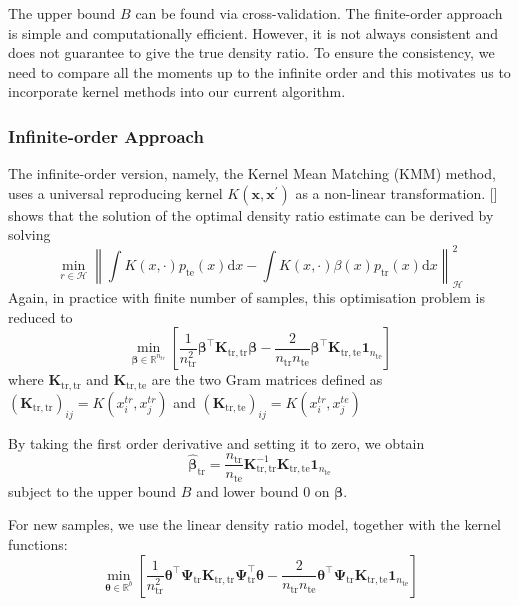 \documentclass[a4paper,12pt]{article}
\begin{document}
The upper bound $B$ can be found via cross-validation. The finite-order approach is simple and computationally efficient. However, it is not always consistent and does not guarantee to give the true density ratio. To ensure the consistency, we need to compare all the moments up to the infinite order and this motivates us to incorporate kernel methods into our current algorithm.

\subsubsection{Infinite-order Approach}
The infinite-order version, namely, the Kernel Mean Matching (KMM) method, uses a universal reproducing kernel $K\left(\boldsymbol{x}, \boldsymbol{x}^{\prime}\right)$ as a non-linear transformation. [\cite{gretton2009covariate}] shows that the solution of the optimal density ratio estimate can be derived by solving 
\begin{equation*}
\min _{r \in \mathcal{H}}\left\|\int K(x, \cdot) p_{\mathrm{te}}(x) \mathrm{d} x-\int K(x, \cdot) \beta(x) p_{\mathrm{tr}}(x) \mathrm{d} x\right\|_{\mathcal{H}}^{2}
\end{equation*}
Again, in practice with finite number of samples, this optimisation problem is reduced to 
\begin{equation*}
\min _{\boldsymbol{\beta} \in \mathbb{R}^{n_{tr}}}\left[\frac{1}{n_{\mathrm{tr}}^{2}} \boldsymbol{\beta}^{\top} \boldsymbol{K}_{\mathrm{tr}, \mathrm{tr}} \boldsymbol{\beta}-\frac{2}{n_{\mathrm{tr}} n_{\mathrm{te}}} \boldsymbol{\beta}^{\top} \boldsymbol{K}_{\mathrm{tr}, \mathrm{te}} \mathbf{1}_{n_{\mathrm{te}}}\right]
\end{equation*}
where $ \boldsymbol{K}_{\mathrm{tr}, \mathrm{tr}}$ and $ \boldsymbol{K}_{\mathrm{tr}, \mathrm{te}}$ are the two Gram matrices defined as $(\boldsymbol{K}_{\mathrm{tr}, \mathrm{tr}})_{ij} = K(x_{i}^{tr}, x_{j}^{tr})$ and $(\boldsymbol{K}_{\mathrm{tr}, \mathrm{te}})_{ij} = K(x_{i}^{tr}, x_{j}^{te})$
 
 By taking the first order derivative and setting it to zero, we obtain
 \begin{equation*}
\widehat{\boldsymbol{\beta}}_{\mathrm{tr}}=\frac{n_{\mathrm{tr}}}{n_{\mathrm{te}}} \boldsymbol{K}_{\mathrm{tr}, \mathrm{tr}}^{-1} \boldsymbol{K}_{\mathrm{tr}, \mathrm{te}} \mathbf{1}_{n_{\mathrm{te}}}
\end{equation*}
subject to the upper bound $B$ and lower bound 0 on ${\boldsymbol{\beta}}$. 

For new samples, we use the linear density ratio model, together with the kernel functions:
\begin{equation*}
\min _{\boldsymbol{\theta} \in \mathbb{R}^{b}}\left[\frac{1}{n_{\mathrm{tr}}^{2}} \boldsymbol{\theta}^{\top} \boldsymbol{\Psi}_{\mathrm{tr}} \boldsymbol{K}_{\mathrm{tr}, \mathrm{tr}} \boldsymbol{\Psi}_{\mathrm{tr}}^{\top} \boldsymbol{\theta}-\frac{2}{n_{\mathrm{tr}} n_{\mathrm{te}}} \boldsymbol{\theta}^{\top} \boldsymbol{\Psi}_{\mathrm{tr}} \boldsymbol{K}_{\mathrm{tr}, \mathrm{te}} \boldsymbol{1}_{n_{\mathrm{te}}}\right]
\end{equation*} 
\end{document}
